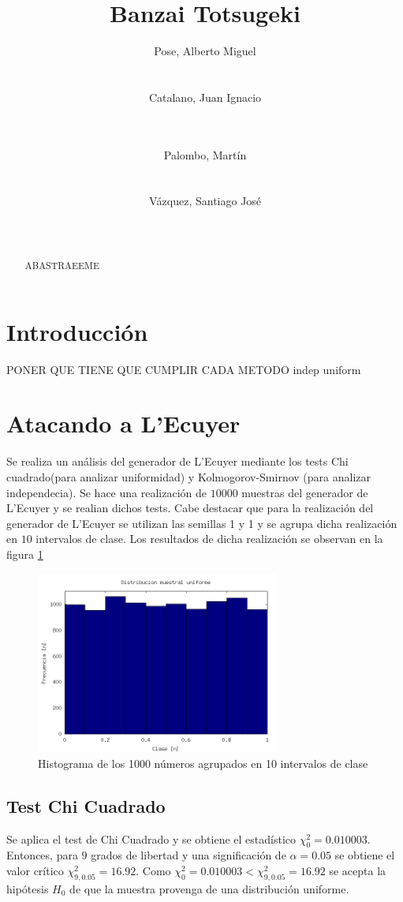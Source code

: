 \documentclass{sig-alternate}
\title{Banzai Totsugeki}
\author{
\alignauthor
Pose, Alberto Miguel\\
       \affaddr{Instituto Tecnol\'ogico de Buenos Aires}\\
       \affaddr{Buenos Aires, Argentina}\\
       \email{apose@alu.itba.edu.ar}
\alignauthor
Catalano, Juan Ignacio\\
       \affaddr{Instituto Tecnol\'ogico de Buenos Aires}\\
       \affaddr{Buenos Aires, Argentina}\\
       \email{jcatalan@alu.itba.edu.ar}
\and
\alignauthor 
Palombo, Mart\'in\\
       \affaddr{Instituto Tecnol\'ogico de Buenos Aires}\\
       \affaddr{Buenos Aires, Argentina}\\
       \email{mpalombo@alu.itba.edu.ar}
\alignauthor 
V\'azquez, Santiago Jos\'e\\
       \affaddr{Instituto Tecnol\'ogico de Buenos Aires}\\
       \affaddr{Buenos Aires, Argentina}\\
       \email{savazque@alu.itba.edu.ar}
}
\date{}
\begin{document}
\maketitle

\begin{abstract}
ABASTRAEEME
\end{abstract} 

\newpage

\section{Introducci\'on}

PONER QUE TIENE QUE CUMPLIR CADA METODO indep uniform
\section{Atacando a L'Ecuyer}
\label{sec:goingdown}

Se realiza un an\'alisis del generador de L'Ecuyer mediante los tests
Chi cuadrado(para analizar uniformidad) y Kolmogorov-Smirnov
(para analizar independecia).
Se hace una realizaci\'on de $10000$ muestras del generador de L'Ecuyer y se realian dichos tests.
Cabe destacar que para la realizaci\'on del generador de L'Ecuyer se utilizan las semillas 1 y 1 y
se agrupa dicha realizaci\'on en $10$ intervalos de clase. Los resultados de dicha realizaci\'on 
se observan en la figura \ref{fig:histograma_ecuyer}

\begin{figure}[ht]
\label{fig:histograma_ecuyer}
\includegraphics[width=8cm]{histograma_ecuyer}
\caption{Histograma de los 1000 n\'umeros agrupados en 10 intervalos de clase}
\end{figure}

\subsection{Test Chi Cuadrado}
\label{sec:chi}
Se aplica el test de Chi Cuadrado y se obtiene el estad\'istico $\chi_{0}^{2}=0.010003$.
Entonces, para $9$ grados de libertad y una significaci\'on de $\alpha=0.05$ se obtiene
el valor cr\'itico $\chi_{9,0.05}^{2}=16.92$.
Como $\chi_{0}^{2}=0.010003 < \chi_{9,0.05}^{2}=16.92$ se acepta la hip\'otesis $H_{0}$
de que la muestra provenga de una distribuci\'on uniforme.
\end{document}
